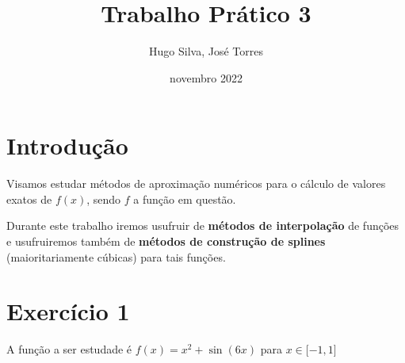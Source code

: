 \documentclass[12pt, letterpaper,fleqn]{article}
\title{Trabalho Prático 3}
\author{Hugo Silva, José Torres}
\date{novembro 2022}
\begin{document}
\maketitle

\section*{Introdução}

Visamos estudar métodos de aproximação numéricos para o cálculo de valores exatos de $f(x)$, sendo $f$ a função em questão.

Durante este trabalho iremos usufruir de \textbf{métodos de interpolação} de funções e usufruiremos também de \textbf{métodos de construção de splines} (maioritariamente cúbicas) para tais funções. 

\section*{Exercício 1}

A função a ser estudade é $f(x) = x^2 + \sin(6x)$ para $x \in \mathopen[-1,1\mathclose]$

\begin{quote}
\centering
\end{quote}
\end{document}
